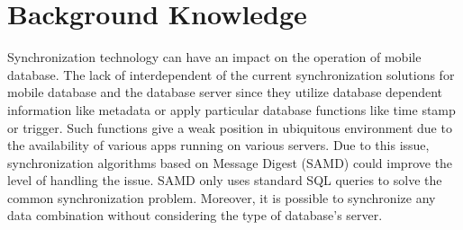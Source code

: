\documentclass[conference]{IEEEtran}
\begin{document}

\section{Background Knowledge}
Synchronization technology can have an impact on the operation of mobile database. The lack of interdependent of the current synchronization solutions for mobile database and the database server since they utilize database dependent information like metadata or apply particular database functions like time stamp or trigger. Such functions give a weak position in ubiquitous environment due to the availability of various apps running on various servers. Due to this issue, synchronization algorithms based on Message Digest (SAMD) could improve the level of handling the issue. SAMD only uses standard SQL queries to solve the common synchronization problem. Moreover, it is possible to synchronize any data combination without considering the type of database's server. 
\end{document}
